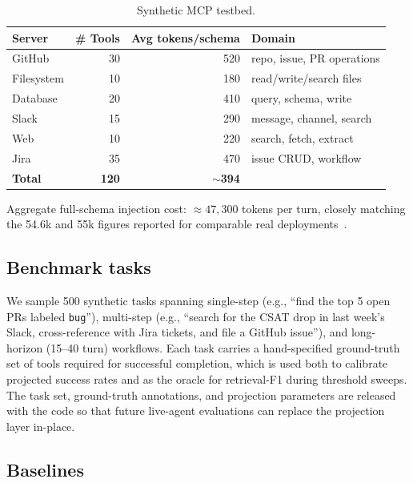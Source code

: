 \documentclass[11pt]{article}
\newcommand{\toprule}{\hline\hline}
\newcommand{\midrule}{\hline}
\newcommand{\bottomrule}{\hline\hline}
\begin{document}
\begin{table}[t]
\centering
\caption{Synthetic MCP testbed.}
\label{tab:testbed}
\begin{tabular}{lrrl}
\toprule
\textbf{Server} & \textbf{\# Tools} & \textbf{Avg tokens/schema} & \textbf{Domain} \\
\midrule
GitHub      & 30 & 520 & repo, issue, PR operations \\
Filesystem  & 10 & 180 & read/write/search files \\
Database    & 20 & 410 & query, schema, write \\
Slack       & 15 & 290 & message, channel, search \\
Web         & 10 & 220 & search, fetch, extract \\
Jira        & 35 & 470 & issue CRUD, workflow \\
\midrule
\textbf{Total} & \textbf{120} & \textbf{$\sim$394} & \\
\bottomrule
\end{tabular}
\end{table}

Aggregate full-schema injection cost: $\approx 47{,}300$ tokens per turn, closely matching the 54.6k and 55k figures reported for comparable real deployments~\citep{kloski2026mcp,saha2026agentic}.

\subsection{Benchmark tasks}

We sample 500 synthetic tasks spanning single-step (e.g., ``find the top 5 open PRs labeled \texttt{bug}''), multi-step (e.g., ``search for the CSAT drop in last week's Slack, cross-reference with Jira tickets, and file a GitHub issue''), and long-horizon (15--40 turn) workflows. Each task carries a hand-specified ground-truth set of tools required for successful completion, which is used both to calibrate projected success rates and as the oracle for retrieval-F1 during threshold sweeps. The task set, ground-truth annotations, and projection parameters are released with the code so that future live-agent evaluations can replace the projection layer in-place.

\subsection{Baselines}
\end{document}

